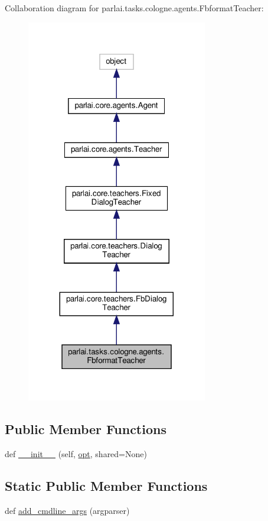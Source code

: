 Collaboration diagram for parlai.\+tasks.\+cologne.\+agents.\+Fbformat\+Teacher\+:
\nopagebreak
\begin{figure}[H]
\begin{center}
\leavevmode
\includegraphics[width=224pt]{d5/dab/classparlai_1_1tasks_1_1cologne_1_1agents_1_1FbformatTeacher__coll__graph}
\end{center}
\end{figure}
\subsection*{Public Member Functions}
\begin{DoxyCompactItemize}
\item 
def \hyperlink{classparlai_1_1tasks_1_1cologne_1_1agents_1_1FbformatTeacher_aa8a25bb85c92156bbd9c4c94c93a852d}{\+\_\+\+\_\+init\+\_\+\+\_\+} (self, \hyperlink{classparlai_1_1core_1_1teachers_1_1FbDialogTeacher_af7a9ec497b9cd0292d7b8fa220da7c28}{opt}, shared=None)
\end{DoxyCompactItemize}
\subsection*{Static Public Member Functions}
\begin{DoxyCompactItemize}
\item 
def \hyperlink{classparlai_1_1tasks_1_1cologne_1_1agents_1_1FbformatTeacher_a05b3cb0bf47e6bb2948f85b03c3bc596}{add\+\_\+cmdline\+\_\+args} (argparser)
\end{DoxyCompactItemize}
